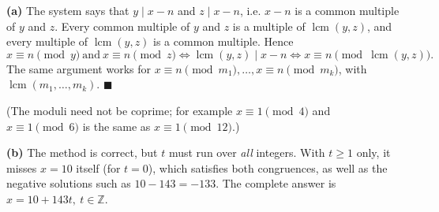 \textbf{(a)} The system says that $y\mid x-n$ and $z\mid x-n$, i.e. $x-n$ is a common multiple of $y$ and $z$. Every common multiple of $y$ and $z$ is a multiple of $\operatorname{lcm}(y,z)$, and every multiple of $\operatorname{lcm}(y,z)$ is a common multiple. Hence
\[x\equiv n\pmod y\ \text{and}\ x\equiv n\pmod z\iff\operatorname{lcm}(y,z)\mid x-n\iff x\equiv n\pmod{\operatorname{lcm}(y,z)} .\]
The same argument works for $x\equiv n\pmod{m_1},\ldots,x\equiv n\pmod{m_k}$, with $\operatorname{lcm}(m_1,\ldots,m_k)$. $\blacksquare$

(The moduli need not be coprime; for example $x\equiv1\pmod4$ and $x\equiv1\pmod6$ is the same as $x\equiv1\pmod{12}$.)

\textbf{(b)} The method is correct, but $t$ must run over \emph{all} integers. With $t\ge1$ only, it misses $x=10$ itself (for $t=0$), which satisfies both congruences, as well as the negative solutions such as $10-143=-133$. The complete answer is $\boxed{x=10+143t,\ t\in\mathbb Z}$.
